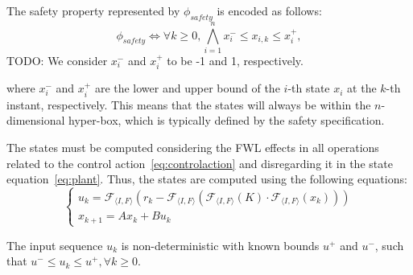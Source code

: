 \documentclass[runningheads,a4paper]{llncs}
\newcommand{\todo}[1]{{\color{red} TODO: #1}}
\begin{document}
The safety property represented by $\phi_{safety}$ is encoded as follows:
%
\begin{equation}
\label{eq:safetyliteral}
\phi_{safety}\iff \forall k\geq 0, \bigwedge_{i=1}^{n}{x_{i}^{-} \leq x_{i,k} \leq x_{i}^{+}},
\end{equation}
%
\todo{We consider $x_{i}^{-}$ and $x_{i}^{+}$ to be -1 and 1, respectively.}

where $x_{i}^{-}$ and $x_{i}^{+}$ are the lower and upper bound 
of the $i$-th state $x_{i}$ at the $k$-th instant, respectively.
This means that the states will always be within the $n$-dimensional 
hyper-box, which is typically defined by the safety specification.

The states must be computed considering 
the FWL effects in all operations related to the control action~\eqref{eq:controlaction} 
and disregarding it in the state equation~\eqref{eq:plant}. 
Thus, the states are computed using the following equations:
%
\begin{equation}
\label{eq:ssunroll}
\left\lbrace
\begin{array}{l}
u_{k}=\mathcal{F}_{\langle I,F \rangle}(r_{k}-\mathcal{F}_{\langle I,F \rangle}(\mathcal{F}_{\langle I,F \rangle}(K)\cdot\mathcal{F}_{\langle I,F \rangle}(x_{k})))\\
x_{k+1}=Ax_{k}+Bu_{k}
\end{array}\right.
\end{equation}

The input sequence $u_{k}$ is non-deterministic with known bounds $u^{+}$ and $u^{-}$, such that ${u^{-} \leq u_{k} \leq u^{+}},\forall k\geq 0$. 


\end{document}
